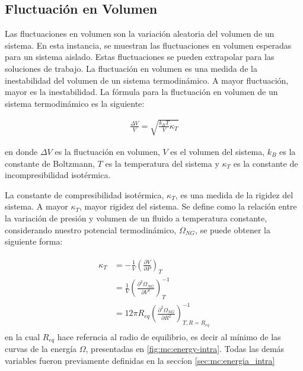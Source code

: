 	
	
	
	\subsection{Fluctuaci\'on en Volumen}\label{sec:mc:fluctuacion}
	
	Las fluctuaciones en volumen son la variaci\'on aleatoria del volumen de un sistema. En esta instancia, se muestran las fluctuaciones en volumen esperadas para un sistema aislado. Estas fluctuaciones se pueden extrapolar para las soluciones de trabajo.
	La fluctuaci\'on en volumen es una medida de la inestabilidad del volumen de un sistema termodin\'amico. A mayor fluctuaci\'on, mayor es la inestabilidad.
	La f\'ormula para la fluctuaci\'on en volumen de un sistema termodin\'amico es la siguiente:
	
	\begin{align}
		\frac{\Delta V}{V} = \sqrt{\frac{k_BT}{V}\kappa_T}
	\end{align}
	
	\noindent en donde $\Delta V$ es la fluctuaci\'on en volumen, $V$ es el volumen del sistema, $k_B$ es la constante de Boltzmann, $T$ es la temperatura del sistema y $\kappa_T$ es la constante de incompresibilidad isot\'ermica. 
	
	La constante de compresibilidad isot\'ermica, $\kappa_T$, es una medida de la rigidez del sistema. A mayor $\kappa_T$, mayor rigidez del sistema.
	Se define como la relación entre la variaci\'on de presi\'on y  volumen de un fluido a temperatura constante, considerando nuestro potencial termodin\'amico, $\Omega_{NG}$, se puede obtener la siguiente forma:
	
	
	\begin{align}
		\begin{aligned}
			\kappa_T & = -\frac{1}{V} \left( \frac{\partial V}{\partial P}\right)_T \\
			& =\frac{1}{V} \left( \frac{\partial^2 \Omega_{NG}}{\partial V^2}\right)^{-1}_T \\
			& = 12 \pi R_{eq} \left( \frac{\partial^2 \Omega_{NG}}{\partial R^2}\right)^{-1}_{T,R=R_{eq}}
		\end{aligned}
	\end{align}
	\noindent en la cual $R_{eq}$ hace referncia al radio de equilibrio, es decir al m\'inimo de las curvas de la energ\'ia $ \Omega$, presentadas en \ref{fig:mc:energy-intra}. Todas las dem\'as variables fueron previamente definidas en la secc\'ion \ref{sec:mc:energia_intra}
	
